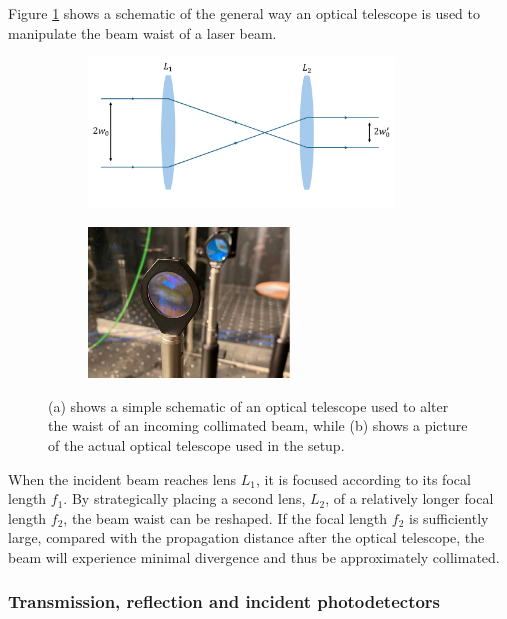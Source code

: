 Figure \ref{fig:telescope} shows a schematic of the general way an optical telescope is used to manipulate the beam waist of a laser beam.

\begin{figure}[h!]
    \begin{subfigure}[b]{0.49\textwidth}
        \centering
        \includegraphics[height=4cm]{figures/optical_telescope.pdf}
        \caption{}
        \label{fig:telescope}
    \end{subfigure}
    \begin{subfigure}[b]{0.49\textwidth}
        \centering
        \includegraphics[height=4cm]{figures/optical_telescope_picture.pdf}
        \caption{}
        \label{fig:telescope_picture}
    \end{subfigure}
    \caption{(a) shows a simple schematic of an optical telescope used to alter the waist of an incoming collimated beam, while (b) shows a picture of the actual optical telescope used in the setup.}
    \label{fig:telescope_sketch_and_pic}
\end{figure}

When the incident beam reaches lens $L_1$, it is focused according to its focal length $f_1$. By strategically placing a second lens, $L_2$, of a relatively longer focal length $f_2$, the beam waist can be reshaped. If the focal length $f_2$ is sufficiently large, compared with the propagation distance after the optical telescope, the beam will experience minimal divergence and thus be approximately collimated.

\subsubsection{Transmission, reflection and incident photodetectors}

